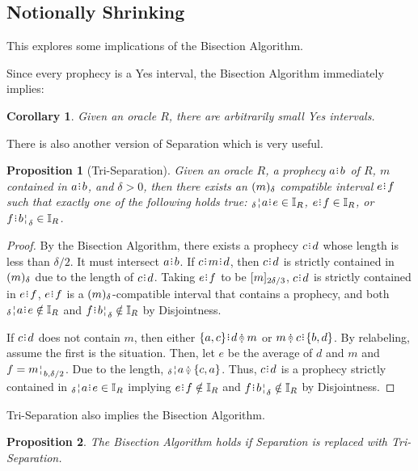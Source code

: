 \documentclass[12pt]{article}
\newtheorem{corollary}{Corollary}[section]
\newtheorem{proposition}{Proposition}[section]
\begin{document}
\subsection{Notionally Shrinking}


This explores some implications of the Bisection Algorithm. 

Since every prophecy is a Yes interval, the Bisection Algorithm immediately implies: 
\begin{corollary}
    Given an oracle $R$, there are arbitrarily small Yes intervals. 
\end{corollary}

There is also another version of Separation which is very useful. 

\begin{proposition}[Tri-Separation]
    Given an oracle $R$, a prophecy $a\rint b$ of $R$, $m$ contained in $a\rint b$, and $\delta > 0$, then there exists an $\halo{m}$ compatible interval $e\rint f$ such that exactly one of the following holds true:   $\fuzbleft{a}\rint e \in \mathbb{I}_R$, $e\rint f \in \mathbb{I}_R$,  or $f\rint \fuzbright{b} \in \mathbb{I}_R$.
\end{proposition}


\begin{proof}
    By the Bisection Algorithm, there exists a prophecy $c\rint d$ whose length is less than $\delta/2$. It must intersect $a \rint b$. If $c\rint m\rint d$, then $c\rint d$ is strictly contained in $\halo{m}$ due to the length of $c\rint d$. Taking $e\rint f$ to be  $\clhalo[2 \delta/3]{m}$, $c\rint d$ is strictly contained in $e\rint f$, $e\rint f$ is a $\halo{m}$-compatible interval that contains a prophecy, and both  $\fuzbleft{a}\rint e \notin \mathbb{I}_R$ and $f\rint \fuzbright{b} \notin \mathbb{I}_R$ by Disjointness. 
    
     If $c\rint d$ does not contain $m$, then either $\{a, c\}\rint d\betneq m$ or $m \betneq c \rint  \{b, d\}$. By relabeling, assume the first is the situation. Then, let $e$ be the average of $d$ and $m$ and $f = \fuzbright[b, \delta/2]{m}$. Due to the length, $\fuzbleft{a} \betneq \{c, a\}$. Thus, $c\rint d$ is a prophecy strictly contained in  $\fuzbleft{a}\rint e \in \mathbb{I}_R$ implying $e\rint f \notin \mathbb{I}_R$ and  $f\rint \fuzbright{b} \notin \mathbb{I}_R$ by Disjointness.
\end{proof}


Tri-Separation also implies the Bisection Algorithm.

\begin{proposition}
    The Bisection Algorithm holds if Separation is replaced with Tri-Separation.
\end{proposition}
\end{document}
